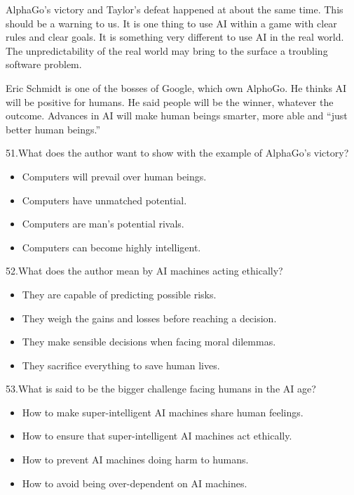 \documentclass[UTF8,11pt]{ctexart}
\begin{document}
AlphaGo’s victory and Taylor’s defeat happened at about the same time. This should be a warning to us. It is one thing to use AI within a game with clear rules and clear goals. It is something very different to use AI in the real world. The unpredictability of the real world may bring to the surface a troubling software problem.


Eric Schmidt is one of the bosses of Google, which own AlphoGo. He thinks AI will be positive for humans. He said people will be the winner, whatever the outcome. Advances in AI will make human beings smarter, more able and “just better human beings.”


51.What does the author want to show with the example of AlphaGo’s victory?


\begin{itemize}[leftmargin=2em,itemsep=.2em,topsep=.4em]\item[A.] Computers will prevail over human beings.
\item[B.] Computers have unmatched potential.
\item[C.] Computers are man’s potential rivals.
\item[D.] Computers can become highly intelligent.
\end{itemize}

52.What does the author mean by AI machines acting ethically?


\begin{itemize}[leftmargin=2em,itemsep=.2em,topsep=.4em]\item[A.] They are capable of predicting possible risks.
\item[B.] They weigh the gains and losses before reaching a decision.
\item[C.] They make sensible decisions when facing moral dilemmas.
\item[D.] They sacrifice everything to save human lives.
\end{itemize}

53.What is said to be the bigger challenge facing humans in the AI age?


\begin{itemize}[leftmargin=2em,itemsep=.2em,topsep=.4em]\item[A.] How to make super-intelligent AI machines share human feelings.
\item[B.] How to ensure that super-intelligent AI machines act ethically.
\item[C.] How to prevent AI machines doing harm to humans.
\item[D.] How to avoid being over-dependent on AI machines.
\end{itemize}
\end{document}
